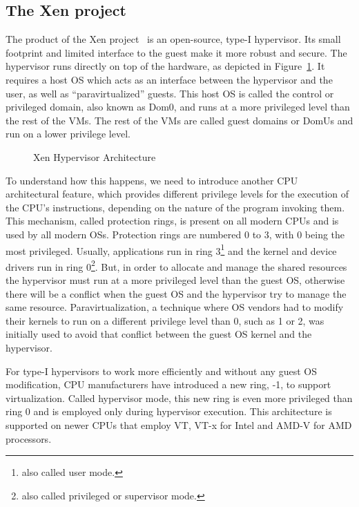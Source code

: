 \subsection{The Xen project}\label{sub:xen}
The product of the Xen project~\cite{xen} is an open-source, type-I hypervisor. Its small footprint and limited interface to the guest make it more robust and secure. The hypervisor runs directly on top of the hardware, as depicted in Figure~\ref{img:xen}. It requires a host \ac{OS} which acts as an interface between the hypervisor and the user, as well as ``paravirtualized'' guests. This host \ac{OS} is called the control or privileged domain, also known as Dom0, and runs at a more privileged level than the rest of the \ac{VM}s. The rest of the \acp{VM} are called guest domains or DomUs and run on a lower privilege level. 

\begin{figure}
	\centering
	
	\caption{Xen Hypervisor Architecture}
	\label{img:xen}
\end{figure}

\par To understand how this happens, we need to introduce another \ac{CPU} architectural feature, which provides different privilege levels for the execution of the \ac{CPU}'s instructions, depending on the nature of the program invoking them. This mechanism, called protection rings, is present on all modern \ac{CPU}s and is used by all modern \acp{OS}. Protection rings are numbered 0 to 3, with 0 being the most privileged. Usually, applications run in ring 3\footnote{also called user mode.} and the kernel and device drivers run in ring 0\footnote{also called privileged or supervisor mode.}. But, in order to allocate and manage the shared resources the hypervisor must run at a more privileged level than the guest \ac{OS}, otherwise there will be a conflict when the guest \ac{OS} and the hypervisor try to manage the same resource. Paravirtualization, a technique where \ac{OS} vendors had to modify their kernels to run on a different privilege level than 0, such as 1 or 2, was initially used to avoid that conflict between the guest \ac{OS} kernel and the hypervisor.

\par For type-I hypervisors to work more efficiently and without any guest \ac{OS} modification, \ac{CPU} manufacturers have introduced a new ring, -1, to support virtualization. Called hypervisor mode, this new ring is even more privileged than ring 0 and is employed only during hypervisor execution. This architecture is supported on newer \ac{CPU}s that employ \ac{VT}, VT-x for Intel and AMD-V for AMD processors. 

